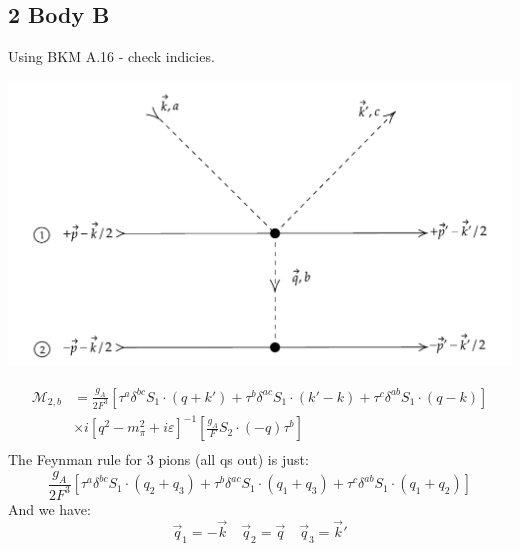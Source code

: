 \documentclass[11pt]{article}
\newcommand\mm{\mathcal{M}}
\newcommand{\mpi}{m_\pi}
\begin{document}
\subsection{2 Body B}
Using BKM A.16 - check indicies.
\begin{center}
    \includegraphics[scale=0.9]{2b.pdf}
\end{center}
\begin{align}
\mm_{2,b}&=\frac{g_A}{2F^3} \left[ \tau^a \delta^{bc} S_1 \cdot(q+k') + \tau^b \delta^{ac} S_1 \cdot(k'-k)+ \tau^c \delta^{ab} S_1 \cdot \left( q-k \right)\right]\nonumber\\
             &\times i \left[ q^2-\mpi^2 +i \varepsilon \right]^{-1} \left[ \frac{g_A}{F} S_2\cdot(-q) \tau^b \right]\\
\end{align}
The Feynman rule for 3 pions (all qs out) is just:
\begin{equation}
    \frac{g_A}{2F^3}\left[ \tau^a \delta^{bc} S_1 \cdot(q_2+q_3) + \tau^b \delta^{ac} S_1 \cdot(q_1+q_3)+ \tau^c \delta^{ab} S_1 \cdot \left(q_1+q_2\right)\right]
\end{equation}
And we have:
\begin{equation}
    \vec{q}_1=-\vec{k}\quad \vec{q}_2=\vec{q} \quad \vec{q}_3=\vec{k}'
\end{equation}
\end{document}

